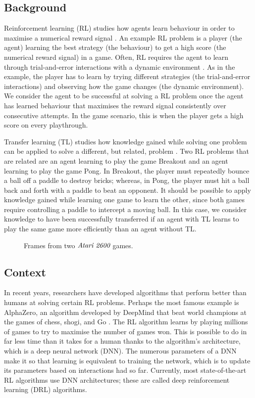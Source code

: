 \documentclass[12pt,a4paper]{article}
\begin{document}
 \subsection{Background} 
Reinforcement learning (RL) studies how agents learn behaviour in order to maximise a numerical reward signal \cite{sutton2018reinforcement}. An example RL problem is a player (the agent) learning the best strategy (the behaviour) to get a high score (the numerical reward signal) in a game. Often, RL requires the agent to learn through trial-and-error interactions with a dynamic environment \cite{Kaelbling1996}. As in the example, the player has to learn by trying different strategies (the trial-and-error interactions) and observing how the game changes (the dynamic environment). We consider the agent to be successful at solving a RL problem once the agent has learned behaviour that maximises the reward signal consistently over consecutive attempts. In the game scenario, this is when the player gets a high score on every playthrough. 

Transfer learning (TL) studies how knowledge gained while solving one problem can be applied to solve a different, but related, problem \cite{2010}. Two RL problems that are related are an agent learning to play the game Breakout and an agent learning to play the game Pong. In Breakout, the player must repeatedly bounce a ball off a paddle to destroy bricks; whereas, in Pong, the player must hit a ball back and forth with a paddle to beat an opponent. It should be possible to apply knowledge gained while learning one game to learn the other, since both games require controlling a paddle to intercept a moving ball. In this case, we consider knowledge to have been successfully transferred if an agent with TL learns to play the same game more efficiently than an agent without TL.

\begin{figure}[ht]
    \centering
    \hfill
    \caption{Frames from two $\emph{Atari 2600}$ games.}
    \label{fig:frames}
\end{figure}

\subsection{Context}
In recent years, researchers have developed algorithms that perform better than humans at solving certain RL problems. Perhaps the most famous example is AlphaZero, an algorithm developed by DeepMind that beat world champions at the games of chess, shogi, and Go \cite{Silver1140}. The RL algorithm learns by playing millions of games to try to maximise the number of games won. This is possible to do in far less time than it takes for a human thanks to the algorithm's architecture, which is a deep neural network (DNN). The numerous parameters of a DNN make it so that learning is equivalent to training the network, which is to update its parameters based on interactions had so far. Currently, most state-of-the-art RL algorithms use DNN architectures; these are called deep reinforcement learning (DRL) algorithms.
\end{document}
